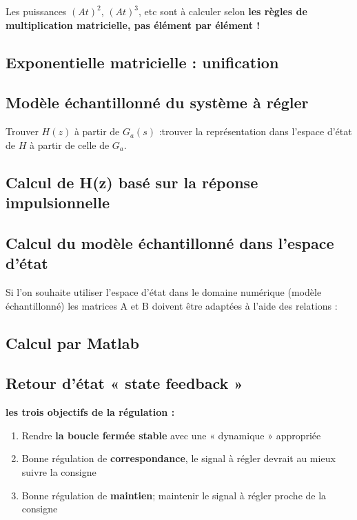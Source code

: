 \documentclass[document.tex]{subfiles}
\begin{document}

Les puissances $(A t)^2$, $(A t)^3$, etc sont à calculer selon \textbf{les règles de multiplication matricielle, pas élément par élément !}

\subsection{Exponentielle matricielle : unification}


\subsection{Modèle échantillonné du système à régler}


Trouver $H(z)$ à partir de $G_a(s)$ :trouver la représentation dans l'espace d'état de $H$ à partir de celle de $G_a$.

\subsection{Calcul de H(z) basé sur la réponse impulsionnelle}


\subsection{Calcul du modèle échantillonné dans l'espace d'état}

Si l'on souhaite utiliser l'espace d'état dans le domaine numérique (modèle échantillonné) les matrices A et B doivent être adaptées à l'aide des relations :


\subsection{Calcul par Matlab}


\subsection{Retour d'état  « state feedback »}

\textbf{les \textbf{trois objectifs} de la régulation :}
\begin{enumerate}
\item Rendre \textbf{la boucle fermée stable} avec une « dynamique » appropriée
\item Bonne régulation de \textbf{correspondance}, le signal à régler devrait au mieux suivre la consigne
\item Bonne régulation de \textbf{maintien}; maintenir le signal à régler proche de la consigne
\end{enumerate}
\end{document}
